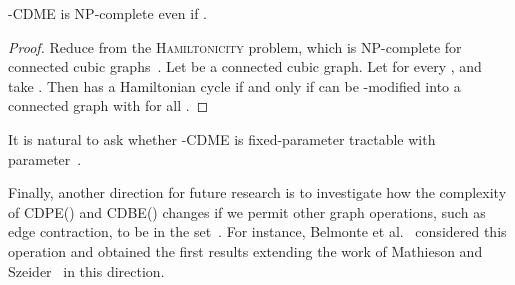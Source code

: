 \documentclass[11pt]{llncs}
\newcommand{\cdpe}{{\sc CDPE}}
\newcommand{\cdbe}{{\sc CDBE}}
\newcommand{\NP}{{\sf NP}}
\begin{document}
\begin{theorem}\label{thm:mod-3}
-\textsc{CDME} is \NP-complete even if .
\end{theorem}

\begin{proof}
Reduce from the \textsc{Hamiltonicity} problem, which is \NP-complete for
connected cubic graphs~\cite{GareyJ79}.  Let  be a connected cubic graph.
Let  for every , and take .  Then 
has a Hamiltonian cycle if and only if  can be -modified into a
connected graph  with  for all .
\end{proof}

\begin{sloppypar}
It is natural to ask whether
-\textsc{CDME} is fixed-parameter tractable with parameter~.
\end{sloppypar}

Finally, another direction for future research is to investigate how the complexity of  \cdpe() and \cdbe() changes
if we permit other graph operations, such as edge contraction, to be in the set~.
For instance, Belmonte et al.~\cite{BGHP14} considered this operation and
obtained the first results extending the work of Mathieson and Szeider~\cite{MathiesonS12} in this direction.


\end{document}
